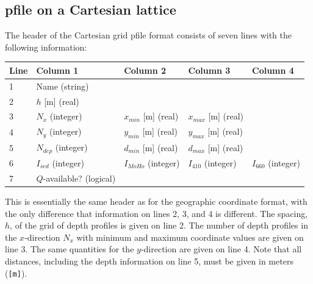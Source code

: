 \documentclass[11pt]{report}
\begin{document}
{\subsection{pfile on a Cartesian lattice}
The header of the Cartesian grid pfile format consists of seven lines with the following information:
\begin{center}
	\begin{tabular}{lllll}\hline
		Line & Column 1                 & Column 2             & Column 3             & Column 4            \\ \hline
		1    & Name (string)            &                      &                      &                     \\ \hline
		2    & $h$ [m] (real)           &                      &                      &                     \\ \hline
		3    & $N_{x}$ (integer)        & $x_{min}$ [m] (real) & $x_{max}$ [m] (real) &                     \\ \hline
		4    & $N_{y}$ (integer)        & $y_{min}$ [m] (real) & $y_{max}$ [m] (real) &                     \\ \hline
		5    & $N_{dep}$ (integer)      & $d_{min}$ [m] (real) & $d_{max}$ [m] (real) &                     \\ \hline
		6    & $I_{sed}$ (integer)      & $I_{MoHo}$ (integer) & $I_{410}$ (integer)  & $I_{660}$ (integer) \\ \hline
		7    & $Q$-available? (logical)                                                                     \\ \hline
	\end{tabular}
\end{center}
This is essentially the same header as for the geographic coordinate format, with the only
difference that information on lines 2, 3, and 4 is different. The spacing, $h$, of the grid of
depth profiles is given on line 2.  The number of depth profiles in the $x$-direction $N_x$ with
minimum and maximum coordinate values are given on line 3. The same quantities for the $y$-direction
are given on line 4. Note that all distances, including the depth information on line 5, must be
given in meters ({\tt [m]}).

}
\end{document}
